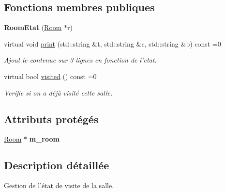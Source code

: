 \subsection*{Fonctions membres publiques}
\begin{DoxyCompactItemize}
\item 
\hypertarget{class_room_etat_aa92454fa4b9473b0932135b8f582abc7}{{\bfseries Room\-Etat} (\hyperlink{class_room}{Room} $\ast$r)}\label{class_room_etat_aa92454fa4b9473b0932135b8f582abc7}

\item 
virtual void \hyperlink{class_room_etat_a89c60a235c1373e1e7ecf8bbe9a7d3d3}{print} (std\-::string \&t, std\-::string \&c, std\-::string \&b) const =0
\begin{DoxyCompactList}\small\item\em Ajout le contenue sur 3 lignes en fonction de l'etat. \end{DoxyCompactList}\item 
virtual bool \hyperlink{class_room_etat_ae02e142515e04ec9ad1219c1a1b99b61}{visited} () const =0
\begin{DoxyCompactList}\small\item\em Verifie si on a déjà visité cette salle. \end{DoxyCompactList}\end{DoxyCompactItemize}
\subsection*{Attributs protégés}
\begin{DoxyCompactItemize}
\item 
\hypertarget{class_room_etat_a5b23317f60b9d268bbe669955b3c4725}{\hyperlink{class_room}{Room} $\ast$ {\bfseries m\-\_\-room}}\label{class_room_etat_a5b23317f60b9d268bbe669955b3c4725}

\end{DoxyCompactItemize}


\subsection{Description détaillée}
Gestion de l'état de visite de la salle. 

